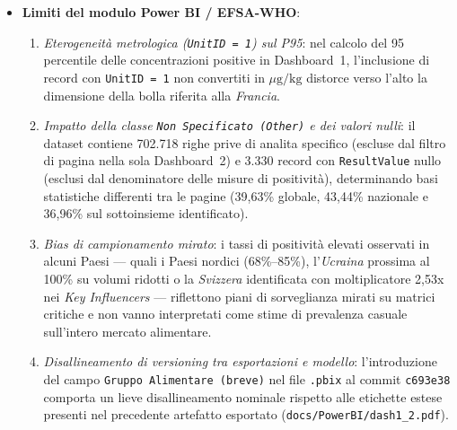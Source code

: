 \begin{itemize}
    \item \textbf{Limiti del modulo Power BI / EFSA-WHO}:
    \begin{enumerate}
        \item \textit{Eterogeneità metrologica (\texttt{UnitID = 1}) sul P95}: nel calcolo del 95\textdegree{} percentile delle concentrazioni positive in Dashboard~1, l'inclusione di record con \texttt{UnitID = 1} non convertiti in $\mu\text{g/kg}$ distorce verso l'alto la dimensione della bolla riferita alla \textit{Francia}.
        \item \textit{Impatto della classe \texttt{Non Specificato (Other)} e dei valori nulli}: il dataset contiene 702.718 righe prive di analita specifico (escluse dal filtro di pagina nella sola Dashboard~2) e 3.330 record con \texttt{ResultValue} nullo (esclusi dal denominatore delle misure di positività), determinando basi statistiche differenti tra le pagine (39,63\% globale, 43,44\% nazionale e 36,96\% sul sottoinsieme identificato).
        \item \textit{Bias di campionamento mirato}: i tassi di positività elevati osservati in alcuni Paesi --- quali i Paesi nordici (68\%--85\%), l'\textit{Ucraina} prossima al 100\% su volumi ridotti o la \textit{Svizzera} identificata con moltiplicatore 2,53x nei \textit{Key Influencers} --- riflettono piani di sorveglianza mirati su matrici critiche e non vanno interpretati come stime di prevalenza casuale sull'intero mercato alimentare.
        \item \textit{Disallineamento di versioning tra esportazioni e modello}: l'introduzione del campo \texttt{Gruppo Alimentare (breve)} nel file \texttt{.pbix} al commit \texttt{c693e38} comporta un lieve disallineamento nominale rispetto alle etichette estese presenti nel precedente artefatto esportato (\texttt{docs/\-PowerBI/\-dash1\_2.pdf}).
    \end{enumerate}
\end{itemize}
